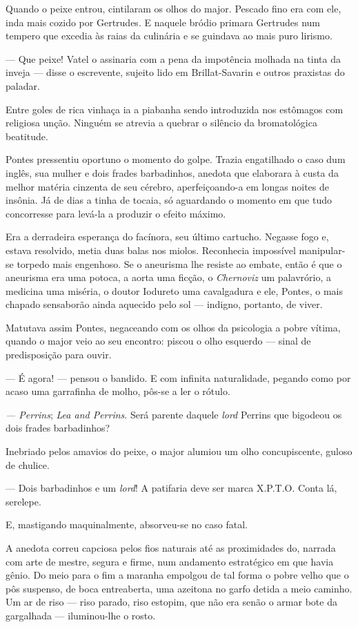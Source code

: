 Quando o peixe entrou, cintilaram os olhos do major. Pescado fino era
com ele, inda mais cozido por Gertrudes. E naquele bródio primara
Gertrudes num tempero que excedia às raias da culinária e se guindava ao
mais puro lirismo.

--- Que peixe! Vatel o assinaria com a pena da impotência molhada na
tinta da inveja --- disse o escrevente, sujeito lido em Brillat-Savarin
e outros praxistas do paladar.

Entre goles de rica vinhaça ia a piabanha sendo introduzida nos
estômagos com religiosa unção. Ninguém se atrevia a quebrar o silêncio
da bromatológica beatitude.

Pontes pressentiu oportuno o momento do golpe. Trazia engatilhado o caso
dum inglês, sua mulher e dois frades barbadinhos, anedota que elaborara
à custa da melhor matéria cinzenta de seu cérebro, aperfeiçoando-a em
longas noites de insônia. Já de dias a tinha de tocaia, só aguardando o
momento em que tudo concorresse para levá-la a produzir o efeito máximo.

Era a derradeira esperança do facínora, seu último cartucho. Negasse
fogo e, estava resolvido, metia duas balas nos miolos. Reconhecia
impossível manipular-se torpedo mais engenhoso. Se o aneurisma lhe
resiste ao embate, então é que o aneurisma era uma potoca, a aorta uma
ficção, o \emph{Chernoviz} um palavrório, a medicina uma miséria, o
doutor Iodureto uma cavalgadura e ele, Pontes, o mais chapado sensaborão
ainda aquecido pelo sol --- indigno, portanto, de viver.

Matutava assim Pontes, negaceando com os olhos da psicologia a pobre
vítima, quando o major veio ao seu encontro: piscou o olho esquerdo ---
sinal de predisposição para ouvir.

--- É agora! --- pensou o bandido. E com infinita naturalidade, pegando
como por acaso uma garrafinha de molho, pôs-se a ler o rótulo.

\emph{--- Perrins}; \emph{Lea and Perrins}. Será parente daquele
\emph{lord} Perrins que bigodeou os dois frades barbadinhos?

Inebriado pelos amavios do peixe, o major alumiou um olho concupiscente,
guloso de chulice.

--- Dois barbadinhos e um \emph{lord}! A patifaria deve ser marca
X.P.T.O. Conta lá, serelepe.

E, mastigando maquinalmente, absorveu-se no caso fatal.

A anedota correu capciosa pelos fios naturais até as proximidades do,
narrada com arte de mestre, segura e firme, num andamento estratégico em
que havia gênio. Do meio para o fim a maranha empolgou de tal forma o
pobre velho que o pôs suspenso, de boca entreaberta, uma azeitona no
garfo detida a meio caminho. Um ar de riso --- riso parado, riso
estopim, que não era senão o armar bote da gargalhada --- iluminou-lhe o
rosto.

